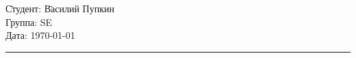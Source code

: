 \begin{tabbing}
\hspace{11cm} \= Студент: \= Василий Пупкин \\
  \> Группа: \> SE \\
  \> Дата: \> \today
\end{tabbing}
\hrule
\vspace{1cm}

